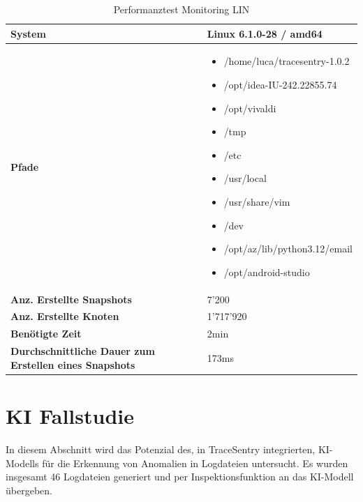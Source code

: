 \documentclass[a4paper,12pt]{report}
\begin{document}
    \begin{table}[h!]
        \centering
        \setlength{\leftmargini}{0.8cm}
        \begin{tabular}{|p{5cm}|p{10cm}|}
            \hline
            \textbf{System}                                                & Linux 6.1.0-28 / amd64 \\ \hline
            \textbf{Pfade} &
            \begin{itemize}
                \item /home/luca/tracesentry-1.0.2
                \item /opt/idea-IU-242.22855.74
                \item /opt/vivaldi
                \item /tmp
                \item /etc
                \item /usr/local
                \item /usr/share/vim
                \item /dev
                \item /opt/az/lib/python3.12/email
                \item /opt/android-studio
            \end{itemize}
            \\ \hline
            \textbf{Anz. Erstellte Snapshots}                              & 7'200                  \\ \hline
            \textbf{Anz. Erstellte Knoten}                                 & 1'717'920              \\ \hline
            \textbf{Benötigte Zeit}                                        & 2min                   \\ \hline
            \textbf{Durchschnittliche Dauer zum Erstellen eines Snapshots} & 173ms                  \\ \hline
        \end{tabular}
        \caption{Performanztest Monitoring LIN}\label{tab:perf-monitoring-lin}
    \end{table}


    \clearpage


    \section{KI Fallstudie}\label{sec:ki-fallstudie}
    In diesem Abschnitt wird das Potenzial des, in TraceSentry integrierten, KI-Modells für die Erkennung von Anomalien in Logdateien untersucht.
    Es wurden insgesamt 46 Logdateien generiert und per Inspektionsfunktion an das KI-Modell übergeben.
\end{document}
